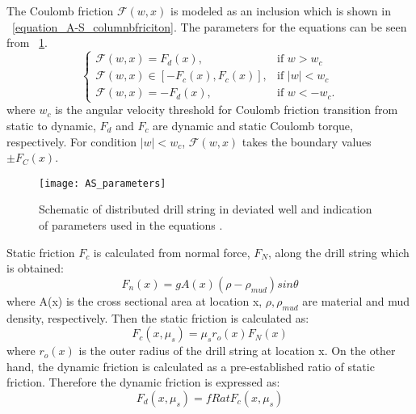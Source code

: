 The Coulomb friction $\mathcal{F}(w,x)$ is modeled as an inclusion which is shown in \equationname~\ref{equation_A-S_columnbfriciton}. The parameters for the equations can be seen from \figurename~\ref{figure_AS_equation_schematic}.
\begin{equation}\label{equation_A-S_columnbfriciton}
  \begin{cases}
     \mathcal{F}(w,x) = F_d(x), & \mbox{if } w>w_c \\
     \mathcal{F}(w,x) \in [-F_c(x), F_c(x)], & \mbox{if } |w|<w_c \ \\
     \mathcal{F}(w,x) = -F_d(x), & \mbox{if } w < -w_c.
  \end{cases}
\end{equation}
where $w_c$ is the angular velocity threshold for Coulomb friction transition from static to dynamic, $F_d$ and $F_c$ are dynamic and static Coulomb torque, respectively. For condition $|w|<w_c$, $\mathcal{F}(w,x)$ takes the boundary values $\pm F_C(x)$.
\begin{figure}[!hpt]
  \centering
  \texttt{[image: AS\_parameters]}
  \caption[Schematic of distributed drill string in deviated well]{Schematic of distributed drill string in deviated well and indication of parameters used in the equations \cite{ref:aarsnes2017a}.}\label{figure_AS_equation_schematic}
\end{figure}

Static friction $F_c$ is calculated from normal force, $F_N$, along the drill string which is obtained:
\begin{equation}\label{equation_AS_normal_force}
  F_n(x) = gA(x)(\rho-\rho_{mud})sin\theta
\end{equation}
where A(x) is the cross sectional area at location x,  $\rho, \rho_{mud}$ are material and mud density, respectively.
Then the static friction is calculated as:
\begin{equation}\label{equation_A-S_static_fric}
  F_c(x,\mu_s) = \mu_sr_o(x)F_N(x)
\end{equation}
where $r_o(x)$ is the outer radius of the drill string at location x. 
On the other hand, the dynamic friction is calculated as a pre-established ratio of static friction. Therefore the dynamic friction is expressed as:
\begin{equation}\label{equation_A-S_dynamic_fric}
  F_d(x,\mu_s) = fRat F_c(x,\mu_s)
\end{equation}

